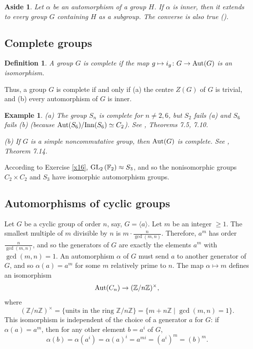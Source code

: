 \documentclass[a4paper,11pt,final]{memoir}%
\newtheorem{definition}[X]{Definition}
\newtheorem{example}[X]{Example}
\newtheorem{aside}[X]{Aside}
\theoremstyle{nonumberplain}
\begin{document}
\begin{aside}
\label{it100b}Let $\alpha$ be an automorphism of a group $H$. If $\alpha$ is
inner, then it extends to every group $G$ containing $H$ as a subgroup. The
converse is also true (\cite{schupp1987}).
\end{aside}

\subsection{Complete groups}

\begin{definition}
\label{it00b}A group $G$ is \emph{complete\/}%
if the map $g\mapsto i_{g}\colon G\rightarrow\operatorname{Aut}(G)$ is an isomorphism.
\end{definition}

Thus, a group $G$ is complete if and only if (a) the centre $Z(G)$ of $G$ is
trivial, and (b) every automorphism of $G$ is inner.

\begin{example}
\label{it09} (a) The group $S_{n}$ is complete for $n\neq2,6$, but $S_{2}$
fails (a) and $S_{6}$ fails (b) (because $\operatorname{Aut}(S_{6})/\text{Inn}(S_{6})\simeq
C_{2}$). See \cite{rotman1995}, Theorems 7.5, 7.10.

(b) If $G$ is a simple noncommutative group, then $\operatorname{Aut}(G)$ is complete. See
\cite{rotman1995}, Theorem 7.14.
\end{example}

According to Exercise \ref{x16}, $\operatorname{GL}_{2}\left(  \mathbb{F}{}_{2}\right)
\approx S_{3}$, and so the nonisomorphic groups $C_{2}\times C_{2}$ and
$S_{3}$ have isomorphic automorphism groups.

\subsection{Automorphisms of cyclic groups}

Let $G$ be a cyclic group of order $n$, say, $G=\langle a\rangle$. Let $m$ be
an integer $\geq1$. The smallest multiple of $m$ divisible by $n$ is
$m\cdot\frac{n}{\gcd(m,n)}$. Therefore, $a^{m}$ has order $\frac{n}{\gcd
(m,n)}$, and so the generators of $G$ are exactly the elements $a^{m}$ with
$\gcd(m,n)=1$. An automorphism $\alpha$ of $G$ must send $a$ to another
generator of $G$, and so $\alpha(a)=a^{m}$ for some $m$ relatively prime to
$n$. The map $\alpha\mapsto m$ defines an isomorphism
\[
\operatorname{Aut}(C_{n})\rightarrow(\mathbb{Z}/n\mathbb{Z})^{\times},
\]
where
\[
(\mathbb{Z}/n\mathbb{Z})^{\times}=\{\text{units in the ring }\mathbb{Z}%
/n\mathbb{Z}\}=\{m+n\mathbb{Z}\mid\gcd(m,n)=1\}.
\]
This isomorphism is independent of the choice of a generator $a$ for $G$: if
$\alpha(a)=a^{m}$, then for any other element $b=a^{i}$ of $G$,
\[
\alpha(b)=\alpha(a^{i})=\alpha(a)^{i}=a^{mi}=(a^{i})^{m}=(b)^{m}.
\]
\end{document}
